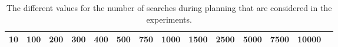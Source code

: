 \begin{table}[htbp]
\footnotesize
\centering
\centerfloat
\setlength{\tabcolsep}{5pt}
\begin{tabular}{cccccccccccccc}
\toprule
10 & 100 & 200 & 300 & 400 & 500 & 750 & 1000 & 1500 & 2500 & 5000 & 7500 & 10000 \\ \bottomrule
\end{tabular}
\caption[Values for the number of searches in experiment]{The different values for the number of searches during planning that are considered in the experiments.}
\label{tab:num_searches}
\end{table} 